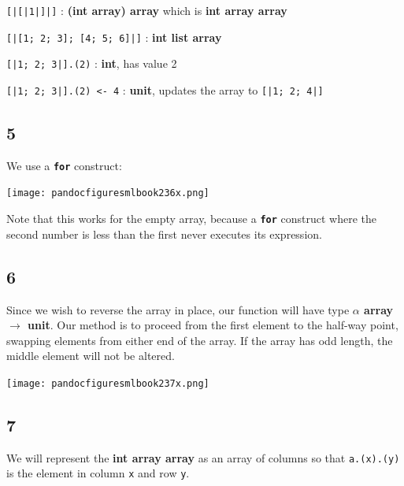 \documentclass[]{book}
\begin{document}
\vspace{2mm}
\noindent \texttt{[|[|1|]|]} : \textbf{\textsf{\textmd{(}int array\textmd{)} array}} which is \textbf{\textsf{int array array}}

\vspace{2mm}
\noindent \texttt{[|[1; 2; 3]; [4; 5; 6]|]} : \textbf{\textsf{int list array}}

\vspace{2mm}
\noindent \texttt{[|1; 2; 3|].(2)} : \textbf{\textsf{int}}, has value 2

\vspace{2mm}
\noindent \texttt{[|1; 2; 3|].(2) <- 4} : \textbf{\textsf{unit}}, updates the array to \texttt{[|1; 2; 4|]}

\subsection*{5}

We use a \textbf{\texttt{for}} construct:

\medskip
\begin{center}
\noindent\texttt{[image: pandocfiguresmlbook236x.png]}
\end{center}
\medskip

\noindent Note that this works for the empty array, because a \textbf{\texttt{for}} construct where the second number is less than the first never executes its expression.

\subsection*{6}

Since we wish to reverse the array in place, our function will have type \textsf{\textbf{$\alpha$ array $\rightarrow$ unit}}. Our method is to proceed from the first element to the half-way point, swapping elements from either end of the array. If the array has odd length, the middle element will not be altered.

\medskip
\begin{center}
\noindent\texttt{[image: pandocfiguresmlbook237x.png]}
\end{center}
\medskip

\subsection*{7}
We will represent the \textbf{\textsf{int array array}} as an array of columns so that \texttt{a.(x).(y)} is the element in column \texttt{x} and row \texttt{y}.
\end{document}
